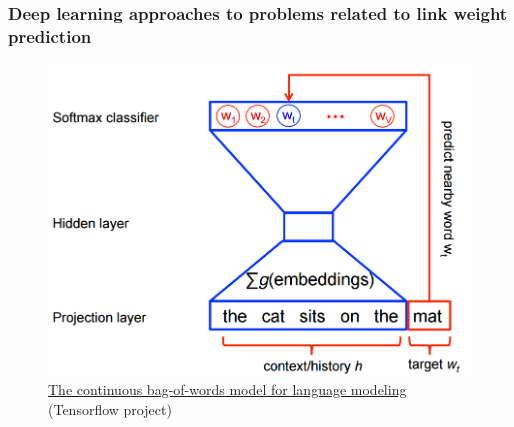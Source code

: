 \documentclass{article}
\begin{document}
\subsubsection{Deep learning approaches to problems related to link weight prediction}
\begin{figure}[H]
	\centering
	\includegraphics[width=\linewidth]{softmax-nplm}
	\caption{
		\href{https://www.tensorflow.org/tutorials/word2vec/}
		{The continuous bag-of-words model for language modeling} (Tensorflow project)}
	\label{fig:softmax-nplm}
\end{figure}
\end{document}
